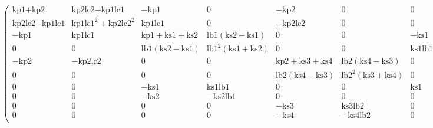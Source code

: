 $$
\left(
\begin{array}{cccccccccc}
 \text{kp1}+\text{kp2} & \text{kp2} \text{lc2}-\text{kp1} \text{lc1} & -\text{kp1} & 0 & -\text{kp2} & 0 & 0 & 0 & 0 & 0 \\
 \text{kp2} \text{lc2}-\text{kp1} \text{lc1} & \text{kp1} \text{lc1}^2+\text{kp2} \text{lc2}^2 & \text{kp1} \text{lc1} & 0 & -\text{kp2} \text{lc2} & 0 & 0 & 0 & 0 & 0 \\
 -\text{kp1} & \text{kp1} \text{lc1} & \text{kp1}+\text{ks1}+\text{ks2} & \text{lb1} (\text{ks2}-\text{ks1}) & 0 & 0 & -\text{ks1} & -\text{ks2} & 0 & 0 \\
 0 & 0 & \text{lb1} (\text{ks2}-\text{ks1}) & \text{lb1}^2 (\text{ks1}+\text{ks2}) & 0 & 0 & \text{ks1} \text{lb1} & -\text{ks2} \text{lb1} & 0 & 0 \\
 -\text{kp2} & -\text{kp2} \text{lc2} & 0 & 0 & \text{kp2}+\text{ks3}+\text{ks4} & \text{lb2} (\text{ks4}-\text{ks3}) & 0 & 0 & -\text{ks3} & -\text{ks4} \\
 0 & 0 & 0 & 0 & \text{lb2} (\text{ks4}-\text{ks3}) & \text{lb2}^2 (\text{ks3}+\text{ks4}) & 0 & 0 & \text{ks3} \text{lb2} & -\text{ks4} \text{lb2} \\
 0 & 0 & -\text{ks1} & \text{ks1} \text{lb1} & 0 & 0 & \text{ks1} & 0 & 0 & 0 \\
 0 & 0 & -\text{ks2} & -\text{ks2} \text{lb1} & 0 & 0 & 0 & \text{ks2} & 0 & 0 \\
 0 & 0 & 0 & 0 & -\text{ks3} & \text{ks3} \text{lb2} & 0 & 0 & \text{ks3} & 0 \\
 0 & 0 & 0 & 0 & -\text{ks4} & -\text{ks4} \text{lb2} & 0 & 0 & 0 & \text{ks4} \\
\end{array}
\right)
$$